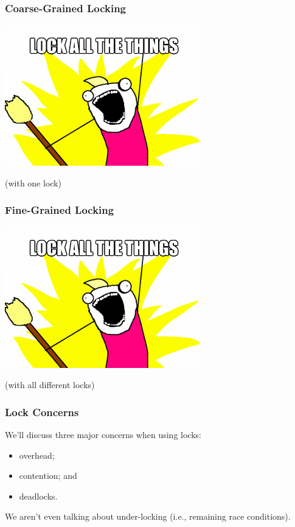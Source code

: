 \begin{frame}
  \frametitle{Coarse-Grained Locking}

  \begin{center}
    \includegraphics[scale=0.5]{images/lock-all-the-things}

    (with one lock)
  \end{center}
\end{frame}

\begin{frame}
  \frametitle{Fine-Grained Locking}

  \begin{center}
    \includegraphics[scale=0.5]{images/lock-all-the-things}

    (with all different locks)
  \end{center}
\end{frame}

\begin{frame}
\frametitle{Lock Concerns}

We'll discuss three major concerns when using locks:
  \begin{itemize}
    \item overhead;
    \item contention; and
    \item deadlocks.
  \end{itemize}
  
  
We aren't even talking about under-locking (i.e., remaining race conditions).

\end{frame}


